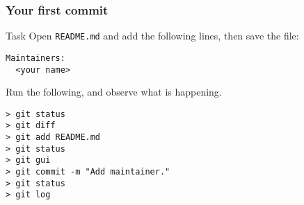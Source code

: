
\begin{frame}[fragile]
	\frametitle{Your first commit}
	
	\begin{block}{Task}
	Open \texttt{README.md} and add the following lines, then save the file:
	\begin{verbatim}
Maintainers:
  <your name>
	\end{verbatim}
	\end{block}

Run the following, and observe what is happening.

	\begin{verbatim}
> git status
> git diff
> git add README.md
> git status
> git gui
> git commit -m "Add maintainer."
> git status
> git log
	\end{verbatim}
	
\end{frame}


